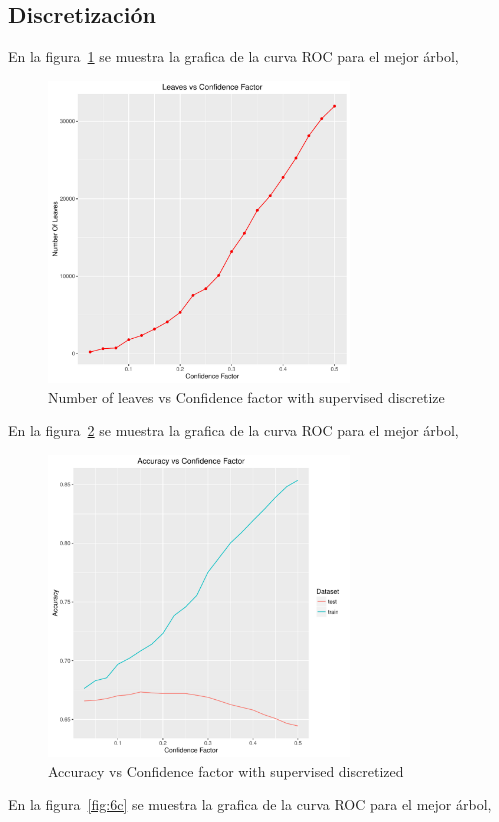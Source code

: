 \subsection{Discretización}

En la figura~\ref{fig:6a} se muestra la grafica de la curva ROC para el mejor árbol,

\begin{figure}
  \centering
  \includegraphics[width = 8cm]{6a.pdf}
  \caption{Number of leaves vs Confidence factor with supervised discretize}
  \label{fig:6a}
\end{figure}

En la figura~\ref{fig:6b} se muestra la grafica de la curva ROC para el mejor árbol,

\begin{figure}
  \centering
  \includegraphics[width = 8cm]{6b.pdf}
  \caption{Accuracy vs Confidence factor with supervised discretized}
  \label{fig:6b}
\end{figure}

En la figura~\ref{fig:6c} se muestra la grafica de la curva ROC para el mejor árbol,

